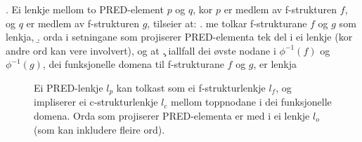 \documentclass[11pt,a4paper,oneside,draft]{book}
\begin{document}
\ex. \label{f-links} Ei lenkje mellom to PRED-element $p$ og $q$, kor
      $p$ er medlem av f-strukturen $f$, og $q$ er medlem av
      f-strukturen $g$, tilseier at:
\a. \label{f-links-substr} me tolkar f-strukturane $f$ og $g$ som lenkja,
\b. \label{f-links-words} orda i setningane som projiserer
     PRED-elementa tek del i ei lenkje (kor andre
     ord kan vere involvert), og at
\c. \label{f-links-domain} iallfall dei øvste nodane i $\phi^{-1}(f)$
     og $\phi^{-1}(g)$, dei funksjonelle domena til f-strukturane $f$
     og $g$, er lenkja 

 \begin{figure}[htp]
    \centering
    

    \caption{Ei PRED-lenkje $l_p$ kan tolkast som ei f-strukturlenkje
    $l_f$, og impliserer ei c-strukturlenkje $l_c$ mellom toppnodane i
    dei funksjonelle domena. Orda som projiserer PRED-elementa er med
    i ei lenkje $l_o$ (som kan inkludere fleire ord).}
   \label{fig:viss-PRED-så-f-og-c}
 \end{figure}
\end{document}
